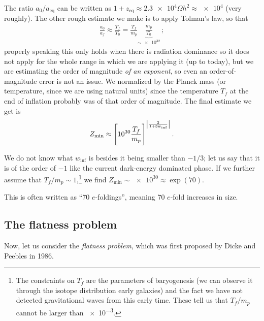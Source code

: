 \documentclass[main.tex]{subfiles}
\begin{document}
The ratio \(a_0 / a _{\text{eq}}\) can be written as \(1 + z _{\text{eq}} \approx \num{2.3e4} \Omega h^2 \approx \num{e4}\) (very roughly).
The other rough estimate we make is to apply Tolman's law, so that 
%
\begin{align}
\frac{a_0 }{a_f} \approx \frac{T_f}{T_0 } = \frac{T_f}{m_p} \underbrace{\frac{m_p}{T_0 }}_{\sim \num{e32}}
\,;
\end{align}
%
properly speaking this only holds when there is radiation dominance so it does not apply for the whole range in which we are applying it (up to today), but we are estimating the order of magnitude \emph{of an exponent}, so even an order-of-magnitude error is not an issue.
We normalized by the Planck mass (or temperature, since we are using natural units) since the temperature \(T_f\) at the end of inflation probably was of that order of magnitude. 
The final estimate we get is 
%
\begin{align}
Z _{\text{min}} \approx \qty[\num{e30} \frac{T_f}{m_p}]^{\abs{ \frac{2}{1 + 3 w _{\text{inf}}}}}
\,.
\end{align}

We do not know what \(w _{\text{inf}}\) is besides it being smaller than \(- 1/3\); let us say that it is of the order of \(-1\) like the current dark-energy dominated phase.
If we further assume that \(T_f / m_p \sim 1\),\footnote{The constraints on \(T_f\) are the parameters of baryogenesis (we can observe it through the isotope distribution early galaxies) and the fact we have not detected gravitational waves from this early time. These tell us that \(T_f / m_p\) cannot be larger than \num{e-3}.} we find \(Z _{\text{min}} \sim \num{e30} \approx \exp(70)\). 

This is often written as ``70 \(e\)-foldings'', meaning 70 \(e\)-fold increases in size. 
 


\subsection{The flatness problem}

Now, let us consider the \emph{flatness problem}, which was first proposed by Dicke and Peebles in 1986.


\end{document}
